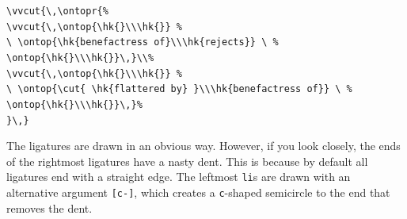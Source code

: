 \documentclass[a4paper,justified]{tufte-handout}
\begin{document}
\noindent\verb|\vvcut{\,\ontopr{|{\color{gray}\texttt{\%}}\\
\hspace*{10pt}\verb|\vvcut{\,\ontop{\hk{}\\\hk{}} |{\color{gray}\texttt{\%}}\\
\hspace*{45.5pt}\verb|\ \ontop{\hk{benefactress of}\\\hk{rejects}} \ |{\color{gray}\texttt{\%}}\\
\hspace*{55.5pt}\verb|\ontop{\hk{}\\\hk{}}\,}\\|{\color{gray}\texttt{\%}}\\
\hspace*{10pt}\verb|\vvcut{\,\ontop{\hk{}\\\hk{}} |{\color{gray}\texttt{\%}}\\
\hspace*{45.5pt}\verb|\ \ontop{\cut{ \hk{flattered by} }\\\hk{benefactress of}} \ |{\color{gray}\texttt{\%}}\\
\hspace*{55.5pt}\verb|\ontop{\hk{}\\\hk{}}\,}|{\color{gray}\texttt{\%}}\\
\verb|}\,}|
\smallskip

The ligatures are drawn in an obvious way. However, if you look closely, the ends of the rightmost ligatures have a nasty dent. This is because by default all ligatures end with a straight edge. The leftmost \texttt{li}s are drawn with an alternative argument \verb|[c-]|, which creates a \texttt{c}-shaped semicircle to the end that removes the dent.
\end{document}
